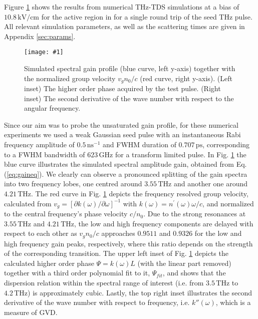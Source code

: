 \documentclass[10pt]{article}
\newcommand{\includegraphicsXS}[1]{\texttt{[image: \#1]}}
\begin{document}
	Figure \ref{fig:img03} shows the results from numerical THz-TDS simulations at a
	bias of $10.8{\,}\mathrm{kV/cm}$ for the active region in
	\cite{burghoff2014terahertz} for a single round trip of the seed THz
	pulse\textrm{.} All relevant simulation parameters, as well as the scattering
	times are given in Appendix \ref{sec:params}.
	
	\begin{figure}[h!]
		\begin{center}
			\includegraphicsXS{THZtds.eps}
		\end{center}
		\caption{Simulated spectral gain profile (blue curve, left y-axis) together
			with the normalized group velocity $v_{g}n_{0}/c$ (red curve, right y-axis).
			(Left inset) The higher order phase acquired by the test pulse. (Right inset) The second derivative of the
			wave number with respect to the angular frequency.}%
		\label{fig:img03}%
	\end{figure}
	
	Since our aim was to probe the unsaturated gain profile, for these numerical
	experiments we used a weak Gaussian seed pulse with an instantaneous Rabi frequency
	amplitude of $0.5{\,}\mathrm{ns}^{-1}$ and FWHM duration of $0.707{\,}%
	\mathrm{ps}$, corresponding to a FWHM bandwidth of $623{\,}\mathrm{GHz}$ for a
	transform limited pulse. In Fig. \ref{fig:img03} the blue curve illustrates
	the simulated spectral amplitude gain, obtained from Eq. (\ref{eq:gaineq}). We
	clearly can observe a pronounced splitting of the gain spectra into two
	frequency lobes, one centred around $3.55{\,}\mathrm{THz}$ and another one
	around $4.21{\,}\mathrm{THz}$. The red curve in Fig. \ref{fig:img03} depicts
	the frequency resolved group velocity, calculated from $v_{g}=[\partial
	k(\omega)/\partial\omega]^{-1}$ with $k(\omega)=n^{\prime}(\omega)\omega/c$,
	and normalized to the central frequency's phase velocity $c/n_{0}$.
	Due to the strong resonances at $3.55{\,}\mathrm{THz}$ and $4.21{\,}%
	\mathrm{THz}$, the low and high frequency components are delayed
	with respect to each other as $v_{g}n_{0}/c$ approaches $0.9511$ and $0.9326$
	for the low and high frequency gain peaks, respectively, where this ratio
	depends on the strength of the corresponding transition. The upper left inset
	of Fig. \ref{fig:img03} depicts the calculated higher order phase
	$\Psi=k(\omega)L$ (with the linear part removed) together with a third order
	polynomial fit to it, $\Psi_{fit}$, and shows that the dispersion relation
	within the spectral range of interest (i.e. from $3.5{\,}\mathrm{THz}$ to
	$4.2{\,}\mathrm{THz}$) is approximately cubic. Lastly, the top right inset
	illustrates the second derivative of the wave number with respect to
	frequency, i.e. $k''(\omega)$, which is a measure of GVD.
		
\end{document}
